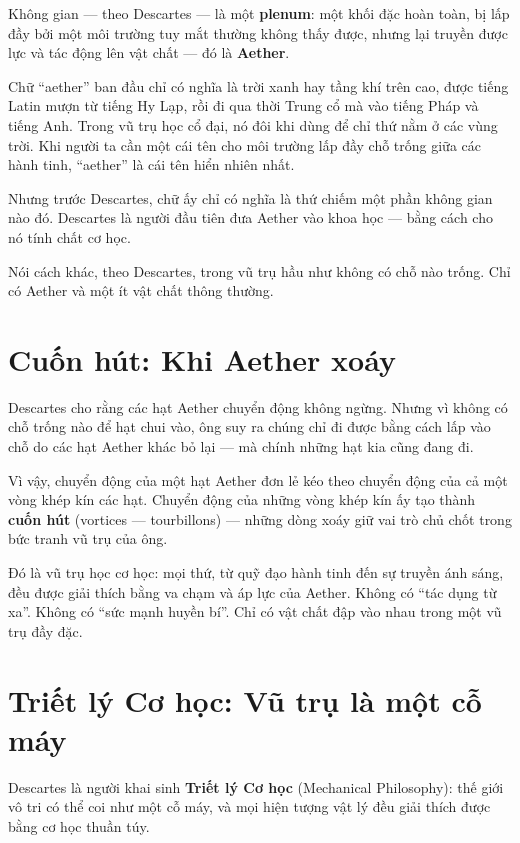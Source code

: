 Không gian — theo Descartes — là một \textbf{plenum}: một khối đặc hoàn toàn, bị lấp đầy bởi một môi trường tuy mắt thường không thấy được, nhưng lại truyền được lực và tác động lên vật chất — đó là \textbf{Aether}.

Chữ “aether” ban đầu chỉ có nghĩa là trời xanh hay tầng khí trên cao, được tiếng Latin mượn từ tiếng Hy Lạp, rồi đi qua thời Trung cổ mà vào tiếng Pháp và tiếng Anh. Trong vũ trụ học cổ đại, nó đôi khi dùng để chỉ thứ nằm ở các vùng trời. Khi người ta cần một cái tên cho môi trường lấp đầy chỗ trống giữa các hành tinh, “aether” là cái tên hiển nhiên nhất.

Nhưng trước Descartes, chữ ấy chỉ có nghĩa là thứ chiếm một phần không gian nào đó. Descartes là người đầu tiên đưa Aether vào khoa học — bằng cách cho nó tính chất cơ học.

Nói cách khác, theo Descartes, trong vũ trụ hầu như không có chỗ nào trống. Chỉ có Aether và một ít vật chất thông thường.


\section{Cuốn hút: Khi Aether xoáy}

Descartes cho rằng các hạt Aether chuyển động không ngừng. Nhưng vì không có chỗ trống nào để hạt chui vào, ông suy ra chúng chỉ đi được bằng cách lấp vào chỗ do các hạt Aether khác bỏ lại — mà chính những hạt kia cũng đang đi.

Vì vậy, chuyển động của một hạt Aether đơn lẻ kéo theo chuyển động của cả một vòng khép kín các hạt. Chuyển động của những vòng khép kín ấy tạo thành \textbf{cuốn hút} (vortices — tourbillons) — những dòng xoáy giữ vai trò chủ chốt trong bức tranh vũ trụ của ông.

Đó là vũ trụ học cơ học: mọi thứ, từ quỹ đạo hành tinh đến sự truyền ánh sáng, đều được giải thích bằng va chạm và áp lực của Aether. Không có “tác dụng từ xa”. Không có “sức mạnh huyền bí”. Chỉ có vật chất đập vào nhau trong một vũ trụ đầy đặc.


\section{Triết lý Cơ học: Vũ trụ là một cỗ máy}

Descartes là người khai sinh \textbf{Triết lý Cơ học} (Mechanical Philosophy): thế giới vô tri có thể coi như một cỗ máy, và mọi hiện tượng vật lý đều giải thích được bằng cơ học thuần túy.

